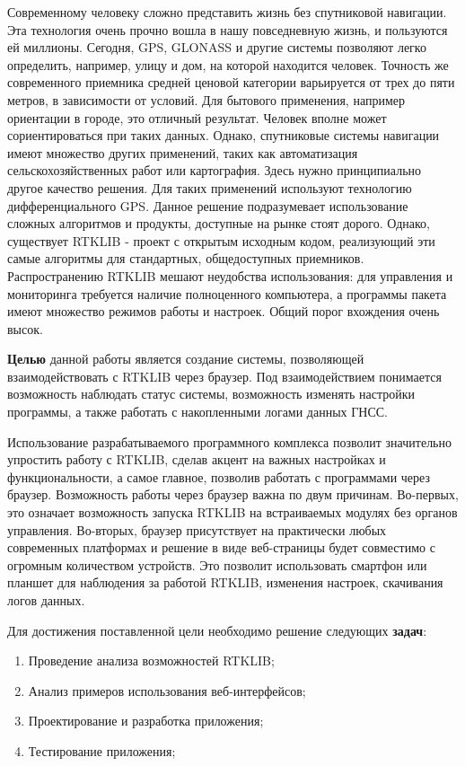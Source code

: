 \intro

Современному человеку сложно представить жизнь без спутниковой навигации. Эта технология очень прочно вошла в нашу повседневную жизнь, и пользуются ей миллионы. Сегодня, GPS, GLONASS и другие системы позволяют легко определить, например, улицу и дом, на которой находится человек. Точность же современного приемника средней ценовой категории варьируется от трех до пяти метров, в зависимости от условий. Для бытового применения, например ориентации в городе, это отличный результат. Человек вполне может сориентироваться при таких данных. Однако, спутниковые системы навигации имеют множество других применений, таких как автоматизация сельскохозяйственных работ или картография. Здесь нужно принципиально другое качество решения. Для таких применений используют технологию дифференциального GPS. Данное решение подразумевает использование сложных алгоритмов и продукты, доступные на рынке стоят дорого. Однако, существует RTKLIB - проект с открытым исходным кодом, реализующий эти самые алгоритмы для стандартных, общедоступных приемников. Распространению RTKLIB мешают неудобства использования: для управления и мониторинга требуется наличие полноценного компьютера, а программы пакета имеют множество режимов работы и настроек. Общий порог вхождения очень высок.

\textbf{Целью} данной работы является создание системы, позволяющей взаимодействовать с RTKLIB через браузер. Под взаимодействием понимается возможность наблюдать статус системы, возможность изменять настройки программы, а также работать с накопленными логами данных ГНСС.

Использование разрабатываемого программного комплекса позволит значительно упростить работу с RTKLIB, сделав акцент на важных настройках и функциональности, а самое главное, позволив работать с программами через браузер. Возможность работы через браузер важна по двум причинам. Во-первых, это означает возможность запуска RTKLIB на встраиваемых модулях без органов управления. Во-вторых, браузер присутствует на практически любых современных платформах и решение в виде веб-страницы будет совместимо с огромным количеством устройств. Это позволит использовать смартфон или планшет для наблюдения за работой RTKLIB, изменения настроек, скачивания логов данных.

Для достижения поставленной цели необходимо решение следующих \textbf{задач}:
\begin{enumerate}
  \item Проведение анализа возможностей RTKLIB;
  \item Анализ примеров использования веб-интерфейсов;
  \item Проектирование и разработка приложения;
  \item Тестирование приложения;
\end{enumerate}

